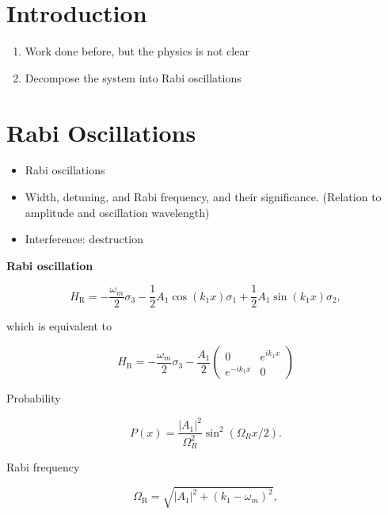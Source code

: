 \documentclass[%
preprint,
 amsmath,amssymb,
 aps,
]{revtex4-1}
\begin{document}

\section{\label{introduction}Introduction}

\begin{enumerate}
    \item Work done before, but the physics is not clear
    \item Decompose the system into Rabi oscillations
\end{enumerate}


\section{\label{rabi}Rabi Oscillations}



\begin{itemize}
    \item Rabi oscillations
    \item Width, detuning, and Rabi frequency, and their significance. (Relation to amplitude and oscillation wavelength)
    \item Interference: destruction
\end{itemize}


{\bf Rabi oscillation}

\begin{equation}
H_{\mathrm R} = -\frac{\omega_m}{2} \sigma_3 - \frac{1}{2}A_1 \cos(k_1 x) \sigma_1 + \frac{1}{2} A_1 \sin(k_1 x) \sigma_2,
\end{equation}

which is equivalent to

\begin{equation}
H_{\mathrm R} = -\frac{\omega_m}{2} \sigma_3 - \frac{A_1}{2} \begin{pmatrix}0 & e^{i k_1 x} \\ e^{-i k_1 x} & 0 \end{pmatrix} 
\end{equation}


Probability

\begin{equation}
P(x) = \frac{\lvert A_1 \rvert^2}{ \Omega_R^2 }  \sin^2 \left( \Omega_R x/2 \right).
\end{equation}

Rabi frequency

\begin{equation}
\Omega_{\mathrm R} = \sqrt{ \lvert A_1 \rvert^2 + (k_1 - \omega_m)^2 },
\end{equation}
\end{document}
